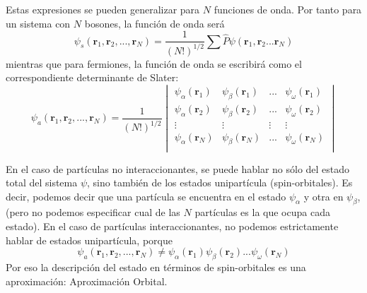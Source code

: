 Estas expresiones se pueden generalizar para $N$ funciones de onda.
Por tanto para un sistema con $N$ bosones, la función de onda 
será
\begin{equation}
    \psi_s(\mathbf{r}_1,\mathbf{r}_2, ..., \mathbf{r}_N) = \frac{1}{(N!)^{1/2}}
    \sum\hat{P}\psi(\mathbf{r}_1,\mathbf{r}_2 ... \mathbf{r}_N) 
\end{equation}
mientras que para fermiones, la función de onda se escribirá como
el correspondiente determinante de Slater:
\begin{equation}
    \psi_a(\mathbf{r}_1,\mathbf{r}_2, ..., \mathbf{r}_N) = \frac{1}{(N!)^{1/2}}
    \begin{vmatrix} 
    \psi_\alpha(\mathbf{r}_1) & \psi_\beta(\mathbf{r}_1) & ... & \psi_\omega(\mathbf{r}_1)  \\
    \psi_\alpha(\mathbf{r}_2) & \psi_\beta(\mathbf{r}_2) & ... & \psi_\omega(\mathbf{r}_2)  \\
    \vdots & \vdots & \vdots& \vdots\\
    \psi_\alpha(\mathbf{r}_N) & \psi_\beta(\mathbf{r}_N) & ... & \psi_\omega(\mathbf{r}_N)  \\
    \end{vmatrix}
\end{equation}

En el caso de partículas no interaccionantes, se puede hablar no sólo del
estado total del sistema $\psi$, sino también de los estados unipartícula
(spin-orbitales). Es decir, podemos decir que una partícula se encuentra 
en el estado $\psi_\alpha$ y otra en $\psi_\beta$, (pero no podemos 
especificar cual de las $N$ partículas es la que ocupa cada estado).
En el caso de partículas interaccionantes, no podemos estrictamente hablar
de estados unipartícula, porque
\begin{equation}
    \psi_a(\mathbf{r}_1,\mathbf{r}_2, ..., \mathbf{r}_N) \neq \psi_\alpha(\mathbf{r}_1)\psi_\beta(\mathbf{r}_2)...\psi_\omega(\mathbf{r}_N)
\end{equation}
 Por eso la descripción del estado en términos de spin-orbitales es una aproximación: Aproximación Orbital.
 
